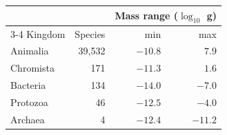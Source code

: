 \begin{tabular}{lrrr}
\toprule
 & & \multicolumn{2}{c}{Mass range ($\log_{10}$ g)} \\
\cmidrule(l){3-4}
Kingdom & Species & min & max \\
\midrule
Animalia & 39{,}532 & $-10.8$ & $7.9$ \\
Chromista & 171 & $-11.3$ & $1.6$ \\
Bacteria & 134 & $-14.0$ & $-7.0$ \\
Protozoa & 46 & $-12.5$ & $-4.0$ \\
Archaea & 4 & $-12.4$ & $-11.2$ \\
\bottomrule
\end{tabular}
